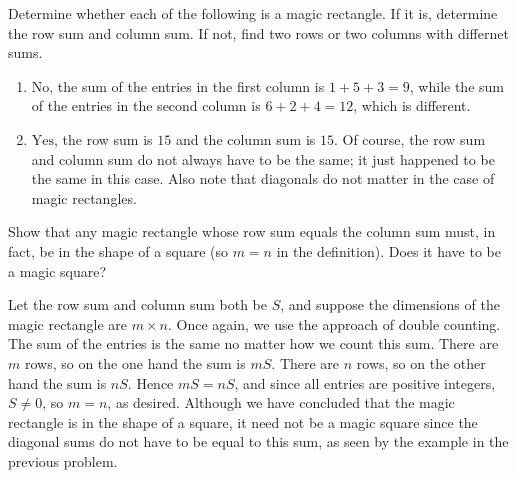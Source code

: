 \documentclass[11pt]{article}
\renewenvironment{problem}{\begin{problems}}{\end{problems}\vspace{5pt}}
\begin{document}
\setcounter{subfigure}{0}
\begin{problem}[4=2+2 points]
Determine whether each of the following is a magic rectangle. If it is, determine the row sum and column sum.
If not, find two rows or two columns with differnet sums.
\begin{figure}[H]
\centering
{} \qquad \qquad
{}
\end{figure}
\end{problem}

\begin{solution}
\begin{enumerate}[label=(\alph*)]
\item $\boxed{\text{No}}$, the sum of the entries in the first column is $1+5+3=9$, while
the sum of the entries in the second column is $6+2+4 = 12$, which is different.

\item $\boxed{\text{Yes}}$, the row sum is $15$ and the column sum is $15$. Of course, the row sum
and column sum do not always have to be the same; it just happened to be the same in this case.
Also note that diagonals do not matter in the case of magic rectangles.
\end{enumerate}
\end{solution}


\begin{problem}[4 points]
Show that any magic rectangle whose row sum equals the column sum must, in fact, be in the shape of a square
(so $m = n$ in the definition). Does it have to be a magic square?
\end{problem}

\begin{solution}
Let the row sum and column sum both be $S$, and suppose the dimensions of the magic rectangle are $m \times n$. 
Once again, we use the approach of double counting.  The sum of the entries is the same no matter how we count this sum.
There are $m$ rows, so on the one hand the sum is $mS$. There are $n$ rows, so on the other hand the sum is $nS$.
Hence $mS = nS$, and since all entries are positive integers, $S \ne 0$, so $m = n$, as desired.
Although we have concluded that the magic rectangle is in the shape of a square, it need not be a magic
square since the diagonal sums do not have to be equal to this sum, as seen by the example in the previous problem.  
\end{solution}
\end{document}
